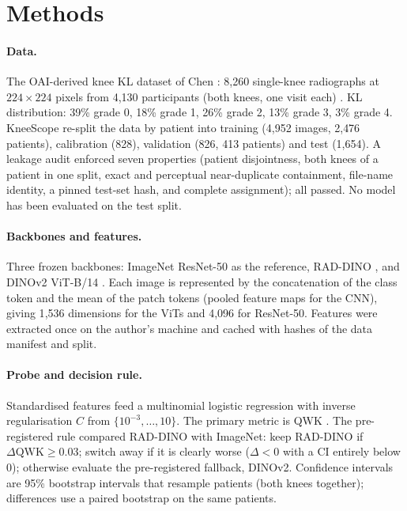 \documentclass[11pt]{article}
\begin{document}
\section{Methods}
\paragraph{Data.} The OAI-derived knee KL dataset of Chen \cite{chen2018data,chen2019knee}: 8{,}260 single-knee radiographs at
\(224\times224\) pixels from 4{,}130 participants (both knees, one visit each) \cite{oai}. KL distribution: 39\% grade 0, 18\% grade 1,
26\% grade 2, 13\% grade 3, 3\% grade 4. KneeScope re-split the data by patient into training (4{,}952 images, 2{,}476 patients),
calibration (828), validation (826, 413 patients) and test (1{,}654). A leakage audit enforced seven properties (patient disjointness,
both knees of a patient in one split, exact and perceptual near-duplicate containment, file-name identity, a pinned test-set hash, and
complete assignment); all passed. No model has been evaluated on the test split.

\paragraph{Backbones and features.} Three frozen backbones: ImageNet ResNet-50 \cite{he2016resnet} as the reference, RAD-DINO
\cite{perezgarcia2025raddino}, and DINOv2 ViT-B/14 \cite{oquab2024dinov2}. Each image is represented by the concatenation of the class
token and the mean of the patch tokens (pooled feature maps for the CNN), giving 1{,}536 dimensions for the ViTs and 4{,}096 for
ResNet-50. Features were extracted once on the author's machine and cached with hashes of the data manifest and split.

\paragraph{Probe and decision rule.} Standardised features feed a multinomial logistic regression with inverse regularisation \(C\)
from \(\{10^{-3},\dots,10\}\). The primary metric is QWK \cite{cohen1968kappa}. The pre-registered rule compared RAD-DINO with ImageNet:
keep RAD-DINO if \(\Delta\mathrm{QWK}\geq 0.03\); switch away if it is clearly worse (\(\Delta<0\) with a CI entirely below 0); otherwise
evaluate the pre-registered fallback, DINOv2. Confidence intervals are 95\% bootstrap intervals that resample patients (both knees
together); differences use a paired bootstrap on the same patients.
\end{document}
